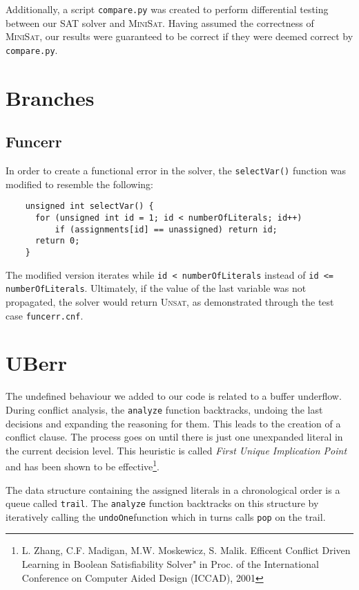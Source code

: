 Additionally, a script \texttt{compare.py} was created to perform differential testing between our SAT solver and \textsc{MiniSat}. Having assumed the correctness of \textsc{MiniSat}, our results were guaranteed to be correct if they were deemed correct by \texttt{compare.py}.
    
\section{Branches}
\subsection{Funcerr}
In order to create a functional error in the solver, the \texttt{selectVar()} function was modified to resemble the following:
    \begin{lstlisting}
    unsigned int selectVar() {  
      for (unsigned int id = 1; id < numberOfLiterals; id++) 
          if (assignments[id] == unassigned) return id;
      return 0;
  	}
 	\end{lstlisting}

The modified version iterates while \texttt{id < numberOfLiterals} instead of \texttt{id <= numberOfLiterals}. Ultimately, if the value of the last variable was not propagated, the solver would return \textsc{Unsat}, as demonstrated through the test case \texttt{funcerr.cnf}.
    
\section{UBerr}
The undefined behaviour we added to our code is related to a buffer underflow. During conflict analysis, the \texttt{analyze} function backtracks, undoing the last decisions and expanding the reasoning for them. This leads to the creation of a conflict clause. The process goes on until there is just one unexpanded literal in the current decision level. This heuristic is called \textit{First Unique Implication Point} and has been shown to be effective\footnote{L. Zhang, C.F. Madigan, M.W. Moskewicz, S. Malik. Efficent Conflict Driven Learning in Boolean Satisfiability Solver" in Proc. of the International Conference on Computer Aided Design (ICCAD), 2001}.

The data structure containing the assigned literals in a chronological order is a queue called \texttt{trail}. The \texttt{analyze} function backtracks on this structure by iteratively calling the \texttt{undoOne}function which in turns calls \texttt{pop} on the trail.

